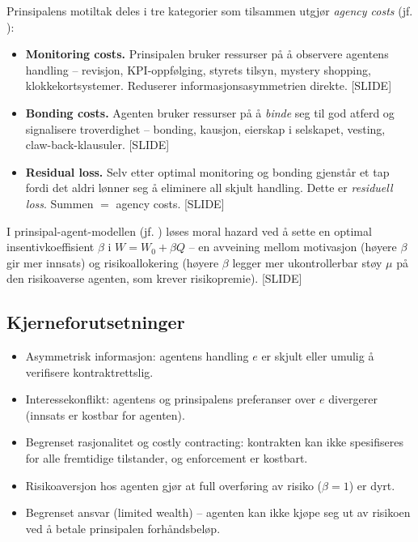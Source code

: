 Prinsipalens motiltak deles i tre kategorier som tilsammen utgjør \emph{agency costs} (jf. ):
\begin{itemize}\setlength{\itemsep}{2pt}
\item \textbf{Monitoring costs.} Prinsipalen bruker ressurser på å observere agentens handling -- revisjon, KPI-oppfølging, styrets tilsyn, mystery shopping, klokkekortsystemer. Reduserer informasjonsasymmetrien direkte. [SLIDE]
\item \textbf{Bonding costs.} Agenten bruker ressurser på å \emph{binde} seg til god atferd og signalisere troverdighet -- bonding, kausjon, eierskap i selskapet, vesting, claw-back-klausuler. [SLIDE]
\item \textbf{Residual loss.} Selv etter optimal monitoring og bonding gjenstår et tap fordi det aldri lønner seg å eliminere all skjult handling. Dette er \emph{residuell loss}. Summen \(=\) agency costs. [SLIDE]
\end{itemize}

I prinsipal-agent-modellen (jf. ) løses moral hazard ved å sette en optimal insentivkoeffisient $\beta$ i $W = W_0 + \beta Q$ -- en avveining mellom motivasjon (høyere $\beta$ gir mer innsats) og risikoallokering (høyere $\beta$ legger mer ukontrollerbar støy $\mu$ på den risikoaverse agenten, som krever risikopremie). [SLIDE]

\subsection*{Kjerneforutsetninger}
\begin{itemize}
\item Asymmetrisk informasjon: agentens handling $e$ er skjult eller umulig å verifisere kontraktrettslig.
\item Interessekonflikt: agentens og prinsipalens preferanser over $e$ divergerer (innsats er kostbar for agenten).
\item Begrenset rasjonalitet og costly contracting: kontrakten kan ikke spesifiseres for alle fremtidige tilstander, og enforcement er kostbart.
\item Risikoaversjon hos agenten gjør at full overføring av risiko ($\beta = 1$) er dyrt.
\item Begrenset ansvar (limited wealth) -- agenten kan ikke kjøpe seg ut av risikoen ved å betale prinsipalen forhåndsbeløp.
\end{itemize}

